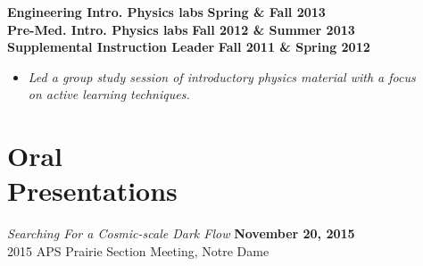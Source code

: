 \documentclass[margin]{res}
\begin{document}
\begin{resume}
\textbf{Engineering Intro. Physics labs} \hfill{} \textbf{Spring \& Fall 2013}\\
\textbf{Pre-Med. Intro. Physics labs} \hfill{} \textbf{Fall 2012 \& Summer 2013}\\
{\bf Supplemental Instruction Leader} \hfill{} \textbf{Fall 2011 \& Spring 2012}
    \begin{itemize}\itemsep -2pt
    \item[] \textit{\small{Led a group study session of introductory physics material with a focus\\on active learning techniques.}}
    \end{itemize}

\begin{comment}
year |   Fall        | Spring        | Summer
1st  | Labs-premed   | labs-eng      | labs-premed
2nd  | Labs-eng      | RA            | RA
3rd  | RA/IntroAstro | Peter's intro | RA
4th  | IntroAstro    | Python        | RA
5th  | Physics C HW  | RA            | RA & REU classes
6th  | Fellowship (GRE Class) | Python | NA!?!
\end{comment}








\section{Oral \\Presentations}
{\sl Searching For a Cosmic-scale Dark Flow} \hfill {\bf November 20, 2015}\\
2015 APS Prairie Section Meeting, Notre Dame


\end{resume}
\end{document}
